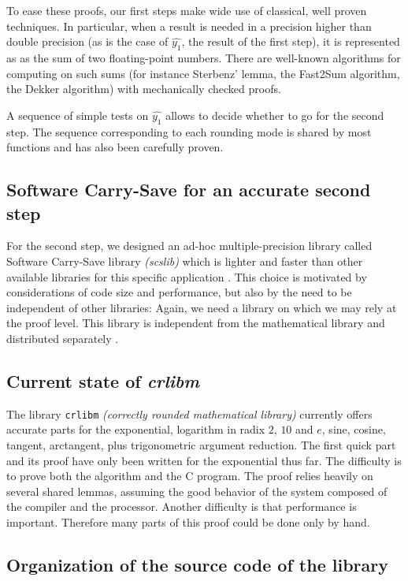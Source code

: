 To ease these proofs, our first steps make wide use of classical, well
proven techniques. In particular, when a result is needed in a
precision higher than double precision (as is the case of $\hat{y_1}$,
the result of the first step), it is represented as as the sum of two
floating-point numbers. There are well-known algorithms for computing
on such sums (for instance Sterbenz' lemma, the Fast2Sum algorithm,
the Dekker algorithm\cite{Knu73}) with mechanically checked proofs.

A sequence of simple tests on $\hat{y_1}$ allows to decide whether to
go for the second step. The sequence corresponding to each rounding
mode is shared by most functions and has also been carefully proven.


\subsection{Software Carry-Save for an accurate second step}
For the second step, we designed an ad-hoc multiple-precision library
called Software Carry-Save library \emph{(scslib)} which is lighter
and faster than other available libraries for this specific
application \cite{DefDin2002,DinDef2003}. This choice is motivated by
considerations of code size and performance, but also by the need to
be independent of other libraries: Again, we need a library on which
we may rely at the proof level. This library is independent from the
mathematical library and distributed separately \cite{SCSweb}.


\subsection{Current state of \emph{crlibm}}

The library \texttt{crlibm} \emph{(correctly rounded mathematical
  library)} currently offers accurate parts for the exponential,
logarithm in radix $2$, $10$ and $e$, sine, cosine, tangent,
arctangent, plus trigonometric argument reduction. The first quick
part and its proof have only been written for the exponential thus
far. The difficulty is to prove both the algorithm and the C program.
The proof relies heavily on several shared lemmas, assuming the good
behavior of the system composed of the compiler and the processor.
Another difficulty is that performance is important. Therefore many
parts of this proof could be done only by hand.


\subsection{Organization of the source code of the library}

